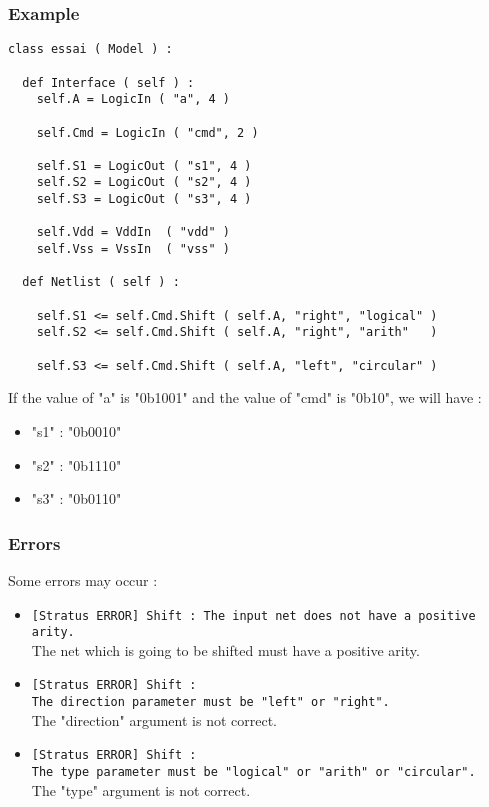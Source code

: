 \subsubsection{Example}

\begin{verbatim}
class essai ( Model ) :

  def Interface ( self ) :
    self.A = LogicIn ( "a", 4 )
    
    self.Cmd = LogicIn ( "cmd", 2 )
    
    self.S1 = LogicOut ( "s1", 4 )
    self.S2 = LogicOut ( "s2", 4 )
    self.S3 = LogicOut ( "s3", 4 )

    self.Vdd = VddIn  ( "vdd" )
    self.Vss = VssIn  ( "vss" )
	
  def Netlist ( self ) :

    self.S1 <= self.Cmd.Shift ( self.A, "right", "logical" ) 
    self.S2 <= self.Cmd.Shift ( self.A, "right", "arith"   ) 
    
    self.S3 <= self.Cmd.Shift ( self.A, "left", "circular" ) 
\end{verbatim}
\indent If the value of "a" is "0b1001" and the value of "cmd" is "0b10", we will have :
\begin{itemize}
    \item "s1" : "0b0010"
    \item "s2" : "0b1110"
    \item "s3" : "0b0110"
\end{itemize}
    
\subsubsection{Errors}
    
Some errors may occur :
\begin{itemize}
    \item \verb-[Stratus ERROR] Shift : The input net does not have a positive arity.-\\The net which is going to be shifted must have a positive arity.
    \item \verb-[Stratus ERROR] Shift :-\\\verb-The direction parameter must be "left" or "right".-\\The "direction" argument is not correct.
    \item \verb-[Stratus ERROR] Shift :-\\\verb-The type parameter must be "logical" or "arith" or "circular".-\\The "type" argument is not correct.
\end{itemize}

